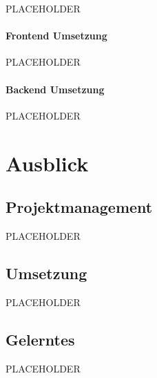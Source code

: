 PLACEHOLDER

\paragraph{Frontend Umsetzung}
\label{sec:org79f99cb}

PLACEHOLDER

\paragraph{Backend Umsetzung}
\label{sec:org46b5693}

PLACEHOLDER

\section{Ausblick}
\label{sec:orgb6e1d1b}
\subsection{Projektmanagement}
\label{sec:orgd2dc269}

PLACEHOLDER

\subsection{Umsetzung}
\label{sec:orge581bdf}

PLACEHOLDER

\subsection{Gelerntes}
\label{sec:orgbf71336}

PLACEHOLDER

